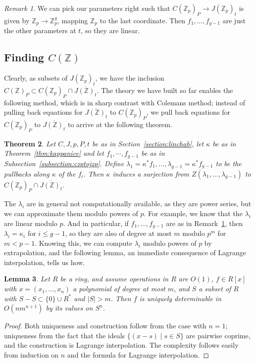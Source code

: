 \documentclass[12pt]{article}
\newcommand{\Z}{\mathbb{Z}}
\theoremstyle{plain}
\newtheorem{thm}{Theorem}[section] %
\newtheorem{lem}[thm]{Lemma} %
\theoremstyle{definition}
\theoremstyle{remark}
\newtheorem{rem}[thm]{Remark} %
\begin{document}
\begin{rem}
\label{rem:fislinear}
We can pick our parameters right such that $C(\Z_p)_P \to J(\Z_p)_t$ is given by $\Z_p \to \Z_p^g$, mapping $\Z_p$ to the last coordinate. Then $f_1,\dots,f_{g-1}$ are just the other parameters at $t$, so they are linear.
\end{rem}

\subsection{Finding \texorpdfstring{$C(\Z)$}{C(Z)}}
Clearly, as subsets of $J(\Z_p)_t$, we have the inclusion $C(\Z)_P \subset C(\Z_p)_P \cap \overline{J(\Z)_t}$. The theory we have built so far enables the following method, which is in sharp contrast with Colemans method; instead of pulling back equations for $\overline{J(\Z)_t}$ to $C(\Z_p)_P$, we pull back equations for $C(\Z_p)_P$ to $\overline{J(\Z)_t}$ to arrive at the following theorem.
\begin{thm}
Let $C,J,p,P,t$ be as in Section~\ref{section:linchab}, let $\kappa$ be as in Theorem~\ref{thm:kappanice} and let $f_1,\cdots,f_{g-1}$ be as in Subsection~\ref{subsection:czptojzp}. Define $\lambda_1 = \kappa^*f_1,\dots,\lambda_{g-1} = \kappa^*f_{g-1}$ to be the pullbacks along $\kappa$ of the $f_i$. Then $\kappa$ induces a surjection from $Z(\lambda_1,\dots,\lambda_{g-1})$ to $C(\Z_p)_P \cap \overline{J(\Z)_t}$.
\end{thm}

The $\lambda_i$ are in general not computationally available, as they are power series, but we can approximate them modulo powers of $p$. For example, we know that the $\lambda_i$ are linear modulo $p$. And in particular, if $f_1,\dots,f_{g-1}$ are as in Remark~\ref{rem:fislinear}, then $\lambda_i = \kappa_i$ for $i \leq g-1$, so they are also of degree at most $m$ modulo $p^m$ for $m < p-1$. Knowing this, we can compute $\lambda_i$ modulo powers of $p$ by extrapolation, and the following lemma, an immediate consequence of Lagrange interpolation, tells us how.
\begin{lem}
\label{lem:interpolate}
Let $R$ be a ring, and assume operations in $R$ are $O(1)$, $f \in R[x]$ with $x = (x_1,\dots,x_n)$ a polynomial of degree at most $m$, and $S$ a subset of $R$ with $S-S \subset \{0\} \cup R^*$ and $|S| > m$. Then $f$ is uniquely determinable in $O(nm^{n+1})$ by its values on $S^n$.
\end{lem} %
\begin{proof}
Both uniqueness and construction follow from the case with $n=1$; uniqueness from the fact that the ideals $\{(x-s) \mid s \in S\}$ are pairwise coprime, and the construction is Lagrange interpolation. The complexity follows easily from induction on $n$ and the formula for Lagrange interpolation.
\end{proof}
\end{document}
